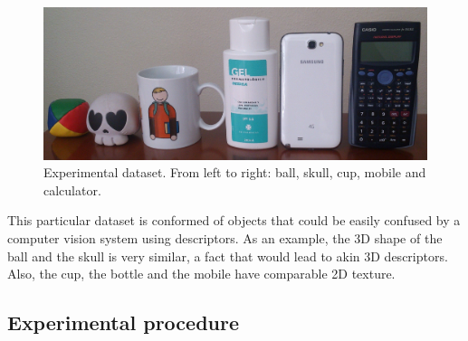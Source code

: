 		\begin{figure}[H]
				\begin{center}
			    \includegraphics[width=\textwidth]{img/tests/dataset02.jpg}
				\caption[Experimental dataset]{Experimental dataset. From left to right: ball, skull, cup, mobile and calculator.}
				\label{dataset}

				\end{center}
		\end{figure}


	
		This particular dataset is conformed of objects that could be easily confused by a computer vision system using descriptors. 
		As an example, the 3D shape of the ball and the skull is very similar, a fact that would lead to akin 3D descriptors. 
		Also, the cup, the bottle and the mobile have comparable 2D texture. 
		\\%

	\subsection{Experimental procedure}
	\label{procedure}

